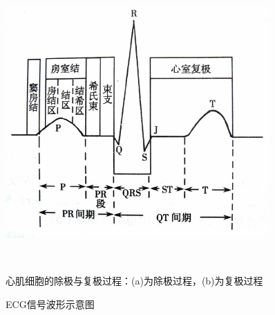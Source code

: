 \begin{figure}[htb]
\begin{center}
\begin{minipage}[b]{0.55\linewidth}
\begin{center}
{\begin{minipage}[b]{\textwidth}
  \end{minipage}
  }
\end{center}
\end{minipage}
~~~~
\begin{minipage}[b]{0.4\linewidth}
  \includegraphics[width=0.9\textwidth]{fig3.png}  
\end{minipage}\\[-10pt]
\begin{minipage}[t]{0.55\linewidth}
\caption{\label{fig2}心肌细胞的除极与复极过程：(a)为除极过程，(b)为复极过程}
\end{minipage}
\begin{minipage}[t]{0.4\linewidth}
\caption{\label{fig3}ECG信号波形示意图}
\end{minipage}
\end{center}
\end{figure}

